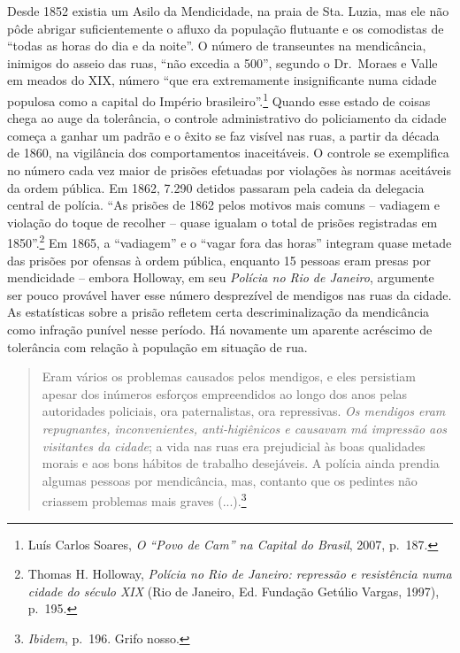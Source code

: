Desde 1852 existia um Asilo da Mendicidade, na praia de Sta. Luzia, mas
ele não pôde abrigar suficientemente o afluxo da população flutuante e
os comodistas de ``todas as horas do dia e da noite''. O número de
transeuntes na mendicância, inimigos do asseio das ruas, ``não excedia a
500'', segundo o Dr.~Moraes e Valle em meados do XIX, número ``que era
extremamente insignificante numa cidade populosa como a capital do
Império brasileiro''.\footnote{Luís Carlos Soares, \emph{O ``Povo de
  Cam'' na Capital do Brasil}, 2007, p.~187.} Quando esse estado de
coisas chega ao auge da tolerância, o controle administrativo do
policiamento da cidade começa a ganhar um padrão e o êxito se faz
visível nas ruas, a partir da década de 1860, na vigilância dos
comportamentos inaceitáveis. O controle se exemplifica no número cada
vez maior de prisões efetuadas por violações às normas aceitáveis da
ordem pública. Em 1862, 7.290 detidos passaram pela cadeia da delegacia
central de polícia. ``As prisões de 1862 pelos motivos mais comuns --
vadiagem e violação do toque de recolher -- quase igualam o total de
prisões registradas em 1850''.\footnote{Thomas H. Holloway,
  \emph{Polícia no Rio de Janeiro: repressão e resistência numa cidade
  do século XIX} (Rio de Janeiro, Ed. Fundação Getúlio Vargas, 1997),
  p.~195.} Em 1865, a ``vadiagem'' e o ``vagar fora das horas'' integram
quase metade das prisões por ofensas à ordem pública, enquanto 15
pessoas eram presas por mendicidade -- embora Holloway, em seu
\emph{Polícia no Rio de Janeiro}, argumente ser pouco provável haver
esse número desprezível de mendigos nas ruas da cidade. As estatísticas
sobre a prisão refletem certa descriminalização da mendicância como
infração punível nesse período. Há novamente um aparente acréscimo de
tolerância com relação à população em situação de rua.

\begin{quote}
Eram vários os problemas causados pelos mendigos, e eles persistiam
apesar dos inúmeros esforços empreendidos ao longo dos anos pelas
autoridades policiais, ora paternalistas, ora repressivas. \emph{Os
mendigos eram repugnantes, inconvenientes, anti-higiênicos e causavam má
impressão aos visitantes da cidade}; a vida nas ruas era prejudicial às
boas qualidades morais e aos bons hábitos de trabalho desejáveis. A
polícia ainda prendia algumas pessoas por mendicância, mas, contanto que
os pedintes não criassem problemas mais graves (...).\footnote{\emph{Ibidem},
  p.~196. Grifo nosso.}
\end{quote}

